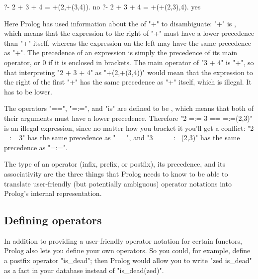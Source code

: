 \begin{LPNcodedisplay}
?- 2 + 3 + 4 = +(2,+(3,4)).
no
?- 2 + 3 + 4 = +(+(2,3),4).
yes
\end{LPNcodedisplay}


Here Prolog has used information about the  of
"+"  to disambiguate:  "+" is , which means that the expression to the right of "+" must
have a lower precedence than "+" itself, whereas the expression on the
left may have the same precedence as "+". The precedence of an
expression is simply the precedence of its main operator,  or 0 if it
is enclosed in brackets.  The main operator of "3 + 4" is "+", so that
interpreting "2 + 3 + 4" as "+(2,+(3,4))" would mean that the
expression to the right of the first "+" has the same precedence as
"+" itself, which is illegal. It has to be lower.

The operators "==", "=:=", and "is" are defined to be
, which means that both of their arguments must have
a lower precedence. Therefore "2 =:= 3 == =:=(2,3)" is an illegal
expression,
since no matter how you bracket it you'll get a conflict:
"2 =:= 3" has the same precedence as "==", and
"3 == =:=(2,3)" has the same precedence as "=:=".

The type of an operator (infix, prefix, or postfix), its precedence,
and its associativity are the three things that Prolog needs to know
to be able to translate user-friendly (but potentially ambiguous)
operator notations into Prolog's internal representation.



\subsection*{Defining operators}\label{SUBSEC.L9.OPERATORS.DEF}



In addition to providing a user-friendly operator notation for certain
functors, Prolog also lets you define your own operators. So you
could, for example, define a postfix operator "is_dead"; then
Prolog would allow you to write "zed is_dead" as a fact in your
database instead of "is_dead(zed)".

